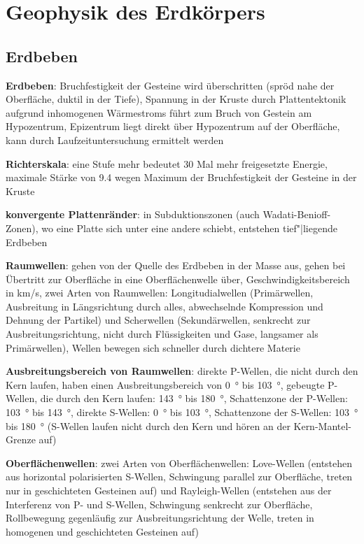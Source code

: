 \chapter{%
    Geophysik des Erdkörpers%
}

\section{%
    Erdbeben%
}

\textbf{Erdbeben}:
Bruchfestigkeit der Gesteine wird überschritten (spröd nahe der Oberfläche, duktil in der Tiefe),
Spannung in der Kruste durch Plattentektonik aufgrund inhomogenen Wärmestroms
führt zum Bruch von Gestein am Hypozentrum,
Epizentrum liegt direkt über Hypozentrum auf der Oberfläche,
kann durch Laufzeituntersuchung ermittelt werden

\textbf{Richterskala}:
eine Stufe mehr bedeutet 30 Mal mehr freigesetzte Energie,
maximale Stärke von \num{9.4} wegen Maximum der Bruchfestigkeit der Gesteine in der Kruste

\textbf{konvergente Plattenränder}:
in Subduktionszonen (auch Wadati-Benioff-Zonen), wo eine Platte sich unter eine andere schiebt,
entstehen tief"|liegende Erdbeben

\textbf{Raumwellen}:
gehen von der Quelle des Erdbeben in der Masse aus,
gehen bei Übertritt zur Oberfläche in eine Oberflächenwelle über,
Geschwindigkeitsbereich in \si{\kilo\meter/\second},
zwei Arten von Raumwellen:
Longitudialwellen (Primärwellen, Ausbreitung in Längsrichtung durch alles,
abwechselnde Kompression und Dehnung der Partikel) und
Scherwellen (Sekundärwellen, senkrecht zur Ausbreitungsrichtung,
nicht durch Flüssigkeiten und Gase, langsamer als Primärwellen),
Wellen bewegen sich schneller durch dichtere Materie

\textbf{Ausbreitungsbereich von Raumwellen}:
direkte P-Wellen, die nicht durch den Kern laufen, haben einen Ausbreitungsbereich von
\SI{0}{\degree} bis \SI{103}{\degree},
gebeugte P-Wellen, die durch den Kern laufen: \SI{143}{\degree} bis \SI{180}{\degree},
Schattenzone der P-Wellen: \SI{103}{\degree} bis \SI{143}{\degree},
direkte S-Wellen: \SI{0}{\degree} bis \SI{103}{\degree},
Schattenzone der S-Wellen: \SI{103}{\degree} bis \SI{180}{\degree}
(S-Wellen laufen nicht durch den Kern und hören an der Kern-Mantel-Grenze auf)

\textbf{Oberflächenwellen}:
zwei Arten von Oberflächenwellen:
Love-Wellen (entstehen aus horizontal polarisierten S-Wellen,
Schwingung parallel zur Oberfläche, treten nur in geschichteten Gesteinen auf) und
Rayleigh-Wellen (entstehen aus der Interferenz von P- und S-Wellen,
Schwingung senkrecht zur Oberfläche,
Rollbewegung gegenläufig zur Ausbreitungsrichtung der Welle,
treten in homogenen und geschichteten Gesteinen auf)

